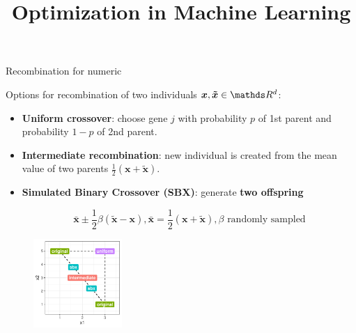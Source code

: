 \documentclass[11pt,compress,t,notes=noshow, xcolor=table]{beamer}
\title{Optimization in Machine Learning}
\date{}
\begin{document}
\sloppy

\begin{vbframe}{Recombination for numeric}

Options for recombination of two individuals $\bm{x}, \bm{\tilde x} \in \R^d$: 
\begin{itemize}
\item \textbf{Uniform crossover}: choose gene $j$ with probability $p$ of 1st parent and probability $1-p$ of 2nd parent.
\item \textbf{Intermediate recombination}: new individual is created from the mean value of two parents $\frac{1}{2}(\bm{x} + \bm{\tilde x})$.
\item \textbf{Simulated Binary Crossover (SBX)}: generate \textbf{two offspring}

$$
\bm{\bar x} \pm \frac{1}{2} \beta (\bm{\tilde x} - \bm{x}), \bm{\bar x} = \frac{1}{2} (\bm{x} + \bm{\tilde x}), \beta \text{ randomly sampled}
$$
\end{itemize}

\vspace*{-0.3cm}
\begin{figure}
  \includegraphics[width=0.3\textwidth]{figure_man/ea_recombination_numeric.pdf}
\end{figure}

\end{vbframe}
\end{document}
